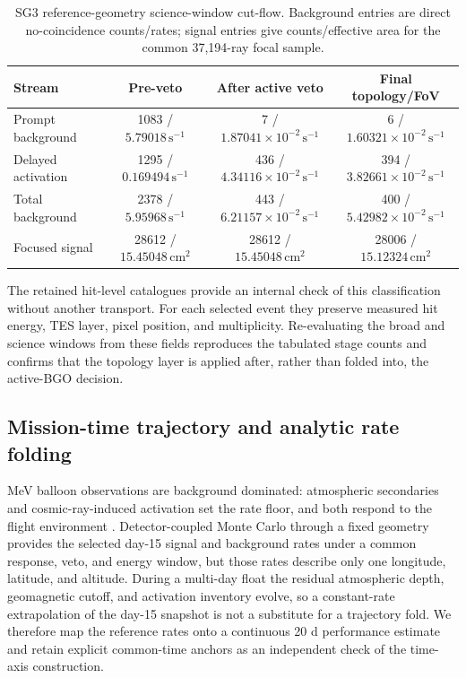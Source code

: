 \documentclass[11pt]{article}
\newcommand{\cps}{\ensuremath{\,\mathrm{s^{-1}}}}
\begin{document}
\begin{table}[t]
\centering
\caption{SG3 reference-geometry science-window cut-flow. Background entries are
direct no-coincidence counts/rates; signal entries give counts/effective area for
the common 37,194-ray focal sample.}
\label{tab:phase2_cutflow}
\footnotesize
\begin{tabular}{lccc}
\toprule
Stream & Pre-veto & After active veto & Final topology/FoV \\
\midrule
Prompt background & 1083 / $5.79018\cps$ & 7 / $1.87041\times10^{-2}\cps$ & 6 / $1.60321\times10^{-2}\cps$ \\
Delayed activation & 1295 / $0.169494\cps$ & 436 / $4.34116\times10^{-2}\cps$ & 394 / $3.82661\times10^{-2}\cps$ \\
Total background & 2378 / $5.95968\cps$ & 443 / $6.21157\times10^{-2}\cps$ & 400 / $5.42982\times10^{-2}\cps$ \\
Focused signal & 28612 / $15.45048\,\mathrm{cm^2}$ & 28612 / $15.45048\,\mathrm{cm^2}$ & 28006 / $15.12324\,\mathrm{cm^2}$ \\
\bottomrule
\end{tabular}
\end{table}

The retained hit-level catalogues provide an internal check of this
classification without another transport. For each selected event they preserve
measured hit energy, TES layer, pixel position, and multiplicity. Re-evaluating
the broad and science windows from these fields reproduces the tabulated stage
counts and confirms that the topology layer is applied after, rather than folded
into, the active-BGO decision.

\subsection{Mission-time trajectory and analytic rate folding}
\label{sec:mission_time_fold}

MeV balloon observations are background dominated: atmospheric secondaries and
cosmic-ray-induced activation set the rate floor, and both respond to the flight
environment \cite{Gallego2025Balloon,Kierans2017}. Detector-coupled Monte Carlo
through a fixed geometry provides the selected day-15 signal and background
rates under a common response, veto, and energy window, but those rates describe
only one longitude, latitude, and altitude. During a multi-day float the residual
atmospheric depth, geomagnetic cutoff, and activation inventory evolve, so a
constant-rate extrapolation of the day-15 snapshot is not a substitute for a
trajectory fold. We therefore map the reference rates onto a continuous 20 d
performance estimate and retain explicit common-time anchors as an independent
check of the time-axis construction.
\end{document}
